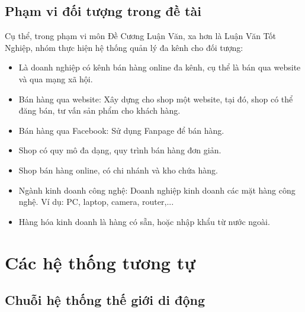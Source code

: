 \subsection{Phạm vi đối tượng trong đề tài} \par
Cụ thể, trong phạm vi môn Đề Cương Luận Văn, xa hơn là Luận Văn Tốt Nghiệp, nhóm thực hiện hệ thống quản lý đa kênh cho đối tượng:
\begin{itemize}
    \item Là doanh nghiệp có kênh bán hàng online đa kênh, cụ thể là bán qua website và qua mạng xã hội.
    \item Bán hàng qua website: Xây dựng cho shop một website, tại đó, shop có thể đăng bán, tư vấn sản phẩm cho khách hàng.
    \item Bán hàng qua Facebook: Sử dụng Fanpage để bán hàng.
    \item Shop có quy mô đa dạng, quy trình bán hàng đơn giản.
    \item Shop bán hàng online, có chi nhánh và kho chứa hàng.
    \item Ngành kinh doanh công nghệ: Doanh nghiệp kinh doanh các mặt hàng công nghệ. Ví dụ: PC, laptop, camera, router,...
    \item Hàng hóa kinh doanh là hàng có sẵn, hoặc nhập khẩu từ nước ngoài.
  \end{itemize} \par


\section{Các hệ thống tương tự}
\subsection{Chuỗi hệ thống thế giới di động}
